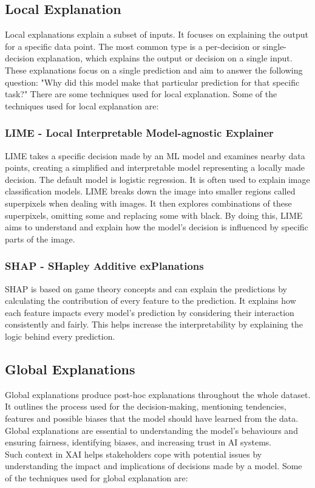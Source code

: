 \documentclass[10pt,journal,compsoc]{IEEEtran}
\begin{document}
\subsection{Local Explanation} Local explanations explain a subset of inputs. It focuses on explaining the output for a specific data point. The most common type is a per-decision or single-decision explanation, which explains the output or decision on a single input.\cite{phillips2020four}
These explanations focus on a single prediction and aim to answer the following question: "Why did this model make that particular prediction for that specific task?" There are some techniques used for local explanation. Some of the techniques used for local explanation are:

\subsubsection{LIME - Local Interpretable Model-agnostic Explainer}
LIME takes a specific decision made by an ML model and examines nearby data points, creating a simplified and interpretable model representing a locally made decision\cite{phillips2020four}. The default model is logistic regression.
It is often used to explain image classification models. LIME breaks down the image into smaller regions called superpixels when dealing with images. It then explores combinations of these superpixels, omitting some and replacing some with black. By doing this, LIME aims to understand and explain how the model's decision is influenced by specific parts of the image.

\subsubsection{SHAP - SHapley Additive exPlanations} SHAP is based on game theory concepts and can explain the predictions by calculating the contribution of every feature to the prediction. It explains how each feature impacts every model's prediction by considering their interaction consistently and fairly. This helps increase the interpretability by explaining the logic behind every prediction.\cite{why-trust-you}

\subsection{Global Explanations}
Global explanations produce post-hoc explanations throughout the whole dataset. It outlines the process used for the decision-making, mentioning tendencies,\\
features and possible biases that the model should have learned from the data. Global explanations are essential to understanding the model's behaviours and ensuring fairness, identifying biases, and increasing trust in AI systems.\cite{phillips2020four} \\
Such context in XAI helps stakeholders cope with potential issues by understanding the impact and implications of decisions made by a model. Some of the techniques used for global explanation are:
\end{document}
